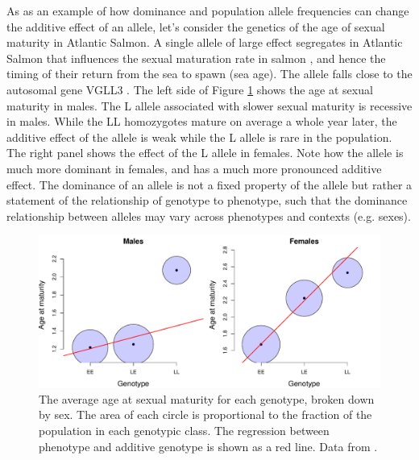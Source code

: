 As as an example of how dominance and population allele frequencies
can change the additive effect of an allele, let's consider the
genetics of the age of sexual maturity in Atlantic Salmon. A single
allele of large effect segregates in Atlantic Salmon that influences
the sexual maturation rate in salmon
\citep{ayllon2015vgll3,barson2015sex}, and hence the timing of their
return from the sea to spawn (sea age). The allele falls close to the
autosomal gene VGLL3 \citep[variation at this gene in humans also
influences the timing of puberty]{cousminer2013genome}. The left side
of Figure \ref{fig:salmon_add_dom} shows the age at  sexual maturity
in males. The L allele associated with slower sexual maturity is recessive in males. While the LL homozygotes mature on average a whole year later, the additive effect of the allele is weak while the L allele is rare in the population. The right panel shows the effect of the L allele in females. Note how the allele is much more dominant in females, and has a much more pronounced additive effect. The dominance of an allele is not a fixed property of the allele but rather a statement of the relationship of genotype to phenotype, such that the dominance relationship between alleles may vary across phenotypes and contexts (e.g. sexes). %



\begin{figure}
\begin{center}
\includegraphics[width=\textwidth]{Journal_figs/Quant_gen/salmon_age/Salmon_age_dom.pdf}
\end{center}
\caption{The average age at sexual maturity for each genotype, broken
  down by sex. 
The area of each circle is proportional to the fraction of
the population in each genotypic class. The regression between phenotype and additive genotype is
  shown as a red line. Data from \citet{barson2015sex}. } \label{fig:salmon_add_dom} %
\end{figure}

